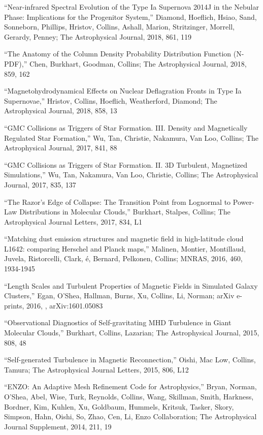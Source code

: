 \medskip
\noindent ``Near-infrared Spectral Evolution of the Type Ia Supernova 2014J in the Nebular Phase: Implications for the Progenitor System,''
Diamond, Hoeflich, Hsiao, Sand, Sonneborn, Phillips, Hristov, Collins, Ashall, Marion, Stritzinger, Morrell, Gerardy, Penney;
The Astrophysical Journal,
 2018,
861,
119

\medskip
\noindent ``The Anatomy of the Column Density Probability Distribution Function (N-PDF),''
Chen, Burkhart, Goodman, Collins;
The Astrophysical Journal,
 2018,
859,
162

\medskip
\noindent ``Magnetohydrodynamical Effects on Nuclear Deflagration Fronts in Type Ia Supernovae,''
Hristov, Collins, Hoeflich, Weatherford, Diamond;
The Astrophysical Journal,
 2018,
858,
13

\medskip
\noindent ``GMC Collisions as Triggers of Star Formation. III. Density and Magnetically Regulated Star Formation,''
Wu, Tan, Christie, Nakamura, Van Loo, Collins;
The Astrophysical Journal,
 2017,
841,
88

\medskip
\noindent ``GMC Collisions as Triggers of Star Formation. II. 3D Turbulent, Magnetized Simulations,''
Wu, Tan, Nakamura, Van Loo, Christie, Collins;
The Astrophysical Journal,
 2017,
835,
137

\medskip
\noindent ``The Razor{\textquoteright}s Edge of Collapse: The Transition Point from Lognormal to Power-Law Distributions in Molecular Clouds,''
Burkhart, Stalpes, Collins;
The Astrophysical Journal Letters,
 2017,
834,
L1

\medskip
\noindent ``Matching dust emission structures and magnetic field in high-latitude cloud L1642: comparing Herschel and Planck maps,''
Malinen, Montier, Montillaud, Juvela, Ristorcelli, Clark, \'e, Bernard, Pelkonen, Collins;
MNRAS,
 2016,
460,
1934-1945

\medskip
\noindent ``Length Scales and Turbulent Properties of Magnetic Fields in Simulated Galaxy Clusters,''
Egan, O'Shea, Hallman, Burns, Xu, Collins, Li, Norman;
arXiv e-prints,
 2016,
,
arXiv:1601.05083

\medskip
\noindent ``Observational Diagnostics of Self-gravitating MHD Turbulence in Giant Molecular Clouds,''
Burkhart, Collins, Lazarian;
The Astrophysical Journal,
 2015,
808,
48

\medskip
\noindent ``Self-generated Turbulence in Magnetic Reconnection,''
Oishi, Mac Low, Collins, Tamura;
The Astrophysical Journal Letters,
 2015,
806,
L12

\medskip
\noindent ``ENZO: An Adaptive Mesh Refinement Code for Astrophysics,''
Bryan, Norman, O'Shea, Abel, Wise, Turk, Reynolds, Collins, Wang, Skillman, Smith, Harkness, Bordner, Kim, Kuhlen, Xu, Goldbaum, Hummels, Kritsuk, Tasker, Skory, Simpson, Hahn, Oishi, So, Zhao, Cen, Li, Enzo Collaboration;
The Astrophysical Journal Supplement,
 2014,
211,
19

